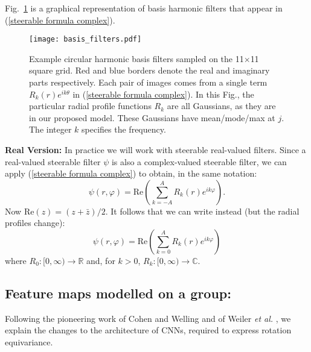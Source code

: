 \documentclass[journal]{IEEEtran}
\newcommand\reals{\mathbb{R}}
\newcommand\complexes{\mathbb{C}}
\renewcommand\Re{\mathrm{Re}}
\begin{document}
	 Fig.~\ref{fig:basis filters} is a graphical representation of basis harmonic filters that appear in (\ref{steerable formula complex}).
	 
	 \begin{figure}[htbp]
		\centering
        \texttt{[image: basis\_filters.pdf]}
		\caption{Example circular harmonic basis filters sampled on the 11$\times$11 square grid. Red and blue borders denote the real and imaginary parts respectively. Each pair of images comes from a single term $R_k(r) e^{ik\theta}$ in (\ref{steerable formula complex}). In this Fig., the particular radial profile functions $R_k$ are all Gaussians, as they are in our proposed model. These Gaussians have mean/mode/max at $j$. The integer $k$ specifies the frequency.} 
		\label{fig:basis filters}
	\end{figure}
	
	 \textbf{Real Version:} In practice we will work with steerable real-valued filters. Since a real-valued steerable filter $\psi$ is also a complex-valued steerable filter, we can apply (\ref{steerable formula complex}) to obtain, in the same notation:
	 	 $$\psi(r,\varphi) = \Re\left(\sum_{k=-A}^A R_k(r) e^{ik\varphi}\right).$$
	 Now $\Re(z) = (z+\bar z)/2$. It follows that we can write instead (but the radial profiles change):
	 \begin{equation}\label{steerable formula real}
	     \psi(r,\varphi) = \Re\left(\sum_{k=0}^A R_k(r) e^{ik\varphi}\right)
	 \end{equation}
	 where $R_0:[0,\infty)\to\reals$ and, for $k>0$, $R_k:[0,\infty)\to\complexes$.
	 

	 \subsection{Feature maps modelled on a group:}\label{G}
	 Following the pioneering work of Cohen and Welling \cite{cohen2016group} and of Weiler \textit{et al.} \cite{weiler2018learning}, we explain the changes to the architecture of CNNs, required to express rotation equivariance.
	 
\end{document}
